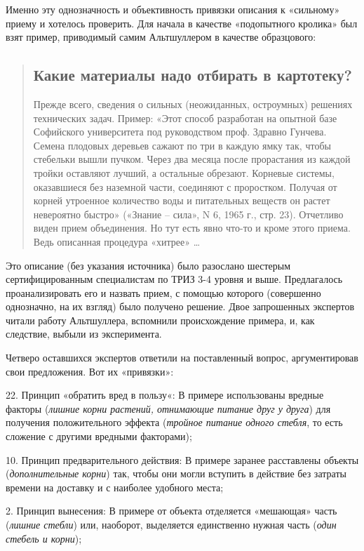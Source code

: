 \documentclass[11pt,a4paper]{article}
\begin{document}
Именно эту однозначность и объективность привязки описания к «сильному» приему
и хотелось проверить. Для начала в качестве «подопытного кролика» был взят
пример, приводимый самим Альтшуллером в качестве образцового:
\begin{quote}
  \subsection*{Какие материалы надо отбирать в картотеку?}

  Прежде всего, сведения о сильных (неожиданных, остроумных) решениях
  технических задач. Пример: «Этот способ разработан на опытной базе
  Софийского университета под руководством проф. Здравно Гунчева. Семена
  плодовых деревьев сажают по три в каждую ямку так, чтобы стебельки вышли
  пучком. Через два месяца после прорастания из каждой тройки оставляют
  лучший, а остальные обрезают. Корневые системы, оказавшиеся без наземной
  части, соединяют с проростком. Получая от корней утроенное количество воды и
  питательных веществ он растет невероятно быстро» («Знание -- сила», N 6,
  1965 г., стр. 23). Отчетливо виден прием объединения. Но тут есть явно
  что-то и кроме этого приема. Ведь описанная процедура «хитрее» …
  \cite{Altshuller1976}
\end{quote}
Это описание (без указания источника) было разослано шестерым
сертифицированным специалистам по ТРИЗ 3-4 уровня и выше. Предлагалось
проанализировать его и назвать прием, с помощью которого (совершенно
однозначно, на их взгляд) было получено решение. Двое запрошенных экспертов
читали работу Альтшуллера, вспомнили происхождение примера, и, как следствие,
выбыли из эксперимента.

Четверо оставшихся экспертов ответили на поставленный вопрос, аргументировав
свои предложения. Вот их «привязки»:

22. Принцип «обратить вред в пользу«: В примере использованы вредные факторы
(\emph{лишние корни растений, отнимающие питание друг у друга}) для получения
положительного эффекта (\emph{тройное питание одного стебля}, то есть сложение
с другими вредными факторами);

10. Принцип предварительного действия: В примере заранее расставлены объекты
(\emph{дополнительные корни}) так, чтобы они могли вступить в действие без
затраты времени на доставку и с наиболее удобного места;

2. Принцип вынесения: В примере от объекта отделяется «мешающая» часть
(\emph{лишние стебли}) или, наоборот, выделяется единственно нужная часть
(\emph{один стебель и корни});
\end{document}
